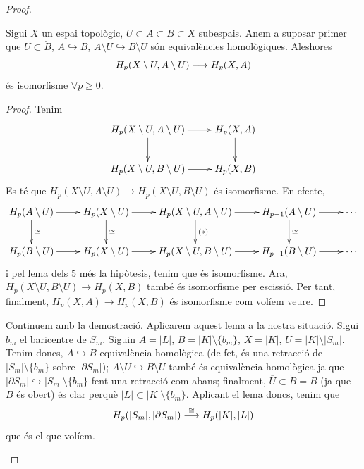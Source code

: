 \documentclass[../main.tex]{subfiles}
\begin{document}
\begin{proof}
\begin{enumerate}[(1)]
\begin{enumerate}
        \begin{lema}
        Sigui $X$ un espai topològic, $U\subset A\subset B\subset X$ subespais. Anem a suposar primer que $\overline{U}\subset\mathring{B}$, $A\hookrightarrow B$, $A\setminus U\hookrightarrow B\setminus U$ són equivalències homològiques. Aleshores
        \begin{equation}
        \notag
        H_p(X\setminus U,A\setminus U)\longrightarrow H_p(X,A)
        \end{equation}
        és isomorfisme $\forall p\geq 0$.
        \end{lema}
        \begin{proof}
        Tenim
        \begin{equation}
        \notag
        \xymatrix{
        H_p(X\setminus U,A\setminus U)\ar[r]\ar[d] & H_p(X,A)\ar[d]\\
        H_p(X\setminus U,B\setminus U)\ar[r] & H_p(X,B)   
        }
        \end{equation}  
        Es té que $H_p(X\setminus U,A\setminus U)\rightarrow H_p(X\setminus U,B\setminus U)$ és isomorfisme. En efecte,
        \begin{equation}
            \notag
            \xymatrix{
            H_p(A\setminus U)\ar[d]^{\cong}\ar[r] & H_p(X\setminus U)\ar[d]^{\cong}\ar[r] & H_p(X\setminus U, A\setminus U)\ar[r]\ar[d]^{(*)} & H_{p-1}(A\setminus U)\ar[r]\ar[d]^{\cong}& \cdots   \\
            H_p(B\setminus U)\ar[r] & H_p(X\setminus U)\ar[r] & H_p(X\setminus U,B\setminus U)\ar[r] & H_{p-1}(B\setminus U)\ar[r] & \cdots
            }
        \end{equation}
        i pel lema dels 5 més la hipòtesis, tenim que és isomorfisme. Ara, $H_p(X\setminus U,B\setminus U)\rightarrow H_p(X,B)$ també és isomorfisme per escissió. Per tant, finalment, $H_p(X,A)\rightarrow H_p(X,B)$ és isomorfisme com volíem veure.
        \end{proof}
        
        Continuem amb la demostració. Aplicarem aquest lema a la nostra situació. Sigui $b_m$ el baricentre de $S_m$. Siguin $A = |L|$, $B = |K|\setminus\{b_m\}$, $X = |K|$, $U = |K|\setminus|S_m|$. Tenim doncs, $A\hookrightarrow B$ equivalència homològica (de fet, és una retracció de $|S_m|\setminus\{b_m\}$ sobre $|\partial S_m|$); $A\setminus U\hookrightarrow B\setminus U$ també és equivalència homològica ja que $|\partial S_m|\hookrightarrow |S_m|\setminus \{b_m\}$ fent una retracció com abans; finalment, $\overline{U}\subset\mathring{B}=B$ (ja que $B$ és obert) és clar perquè $|L|\subset |K|\setminus\{b_m\}$. Aplicant el lema doncs, tenim que 
        \begin{equation}
            \notag
            H_p(|S_m|,|\partial S_m|)\overset{\cong}{\longrightarrow} H_p(|K|,|L|)
        \end{equation}
        que és el que volíem. 


\end{enumerate}
\end{enumerate}
\end{proof}
\end{document}
